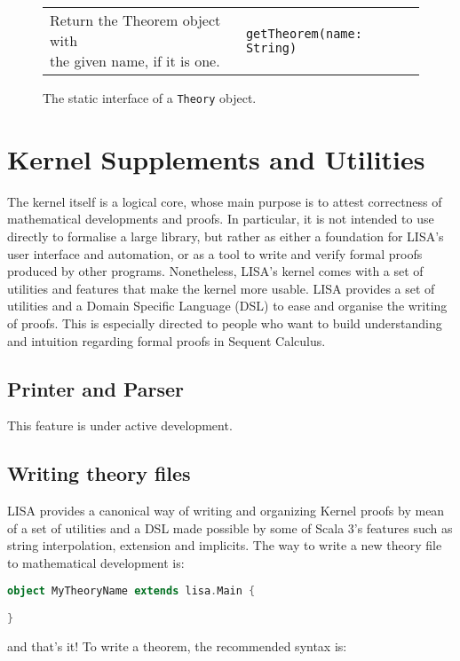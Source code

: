 {\begin{figure}[hp]
\begin{center}
\begin{tabular}{l|l}
\makecell[l]{Return the Theorem object with\\the given name, if it is one.} &
\begin{lstlisting}
getTheorem(name: String)
\end{lstlisting}
\\ %

\end{tabular}
\caption{The static interface of a \lstinline{Theory}{} object.}
\label{fig:theorygetters}
\end{center}
\end{figure}
}
\newpage
\section{Kernel Supplements and Utilities}
\label{sect:kernelsuppl}
The kernel itself is a logical core, whose main purpose is to attest correctness of mathematical developments and proofs. In particular, it is not intended to use directly to formalise a large library, but rather as either a foundation for LISA's user interface and automation, or as a tool to write and verify formal proofs produced by other programs.
Nonetheless, LISA's kernel comes with a set of utilities and features that make the kernel more usable.
LISA provides a set of utilities and a Domain Specific Language (DSL) to ease and organise the writing of proofs. This is especially directed to people who want to build understanding and intuition regarding formal proofs in Sequent Calculus.

\subsection{Printer and Parser}
This feature is under active development.

\subsection{Writing theory files}
LISA provides a canonical way of writing and organizing Kernel proofs by mean of a set of utilities and a DSL made possible by some of Scala 3's features such as string interpolation, extension and implicits. 
The way to write a new theory file to mathematical development is:
\begin{lstlisting}[language=Scala, frame=single]
object MyTheoryName extends lisa.Main {

}
\end{lstlisting}
and that's it! To write a theorem, the recommended syntax is:

